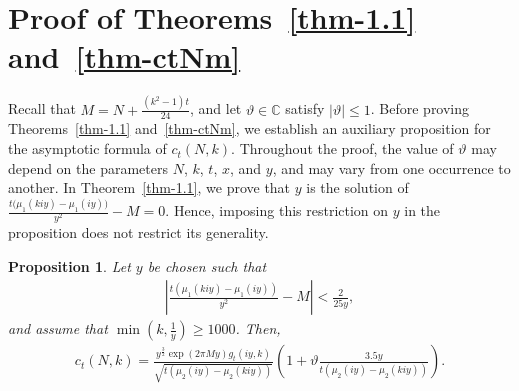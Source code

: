 \documentclass[11pt]{amsart}
\theoremstyle{plain}
\newtheorem{proposition}[theorem]{Proposition}
\numberwithin{equation}{section}
\begin{document}
	\section{Proof of Theorems~\ref{thm-1.1} and~\ref{thm-ctNm}}
	Recall that $M = N + \frac{(k^2-1)t}{24}$, and let $\vartheta \in \mathbb{C}$ satisfy $|\vartheta| \le 1$. Before proving Theorems~\ref{thm-1.1} and~\ref{thm-ctNm}, we establish an auxiliary proposition for the asymptotic formula of $c_t(N,k)$. Throughout the proof, the value of $\vartheta$ may depend on the parameters $N$, $k$, $t$, $x$, and $y$, and may vary from one occurrence to another. In Theorem~\ref{thm-1.1}, we prove that $y$ is the solution of 
	$ \frac{t\bigl(\mu_1(kiy) - \mu_1(iy)\bigr)}{y^2} - M = 0.$
	Hence, imposing this restriction on $y$ in the proposition does not restrict its generality.
	\begin{proposition}\label{thm-main} Let $y$ be chosen such that 
		\begin{align}\label{eq-assum}
			\left|\frac{t(\mu_{1}(kiy)-\mu_1(iy))}{y^{2}}-M\right|<\frac{2}{25y},
		\end{align} and assume that $\min(k,\frac{1}{y})\ge 1000$. Then,
		\begin{align*}
			c_t(N,k)=\frac{y^{\frac{3}{2}}\exp(2\pi My)g_{t}(iy,k)}{\sqrt{t(\mu_{2}(iy)-\mu_2(kiy))}}\left(1+\vartheta\frac{3.5y}{t(\mu_{2}(iy)-\mu_2(kiy))}\right).    
		\end{align*}
	\end{proposition}
\end{document}
